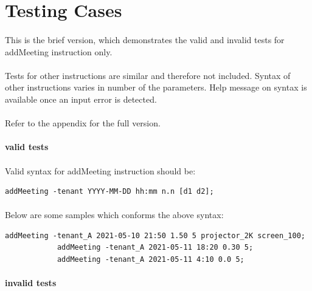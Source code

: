 \documentclass{article}
\begin{document}
    \cleardoublepage
    \section{Testing Cases}
        \paragraph{}
        This is the brief version, which demonstrates the valid and invalid tests for addMeeting instruction only.
        \paragraph{}
        Tests for other instructions are similar and therefore not included. Syntax of other instructions varies in number of the parameters. Help message on syntax is available once an input error is detected.
        \paragraph{}
        Refer to the appendix for the full version. 

        \paragraph{valid tests}
        \paragraph{}
        Valid syntax for addMeeting instruction should be:
        \begin{Verbatim}[gobble=8]
            addMeeting -tenant YYYY-MM-DD hh:mm n.n [d1 d2]; 
        \end{Verbatim}
        \paragraph{}
        Below are some samples which conforms the above syntax:
        \begin{Verbatim}[gobble=8]
            addMeeting -tenant_A 2021-05-10 21:50 1.50 5 projector_2K screen_100;
            addMeeting -tenant_A 2021-05-11 18:20 0.30 5;
            addMeeting -tenant_A 2021-05-11 4:10 0.0 5;
        \end{Verbatim}
        
        
        \paragraph{invalid tests}
\end{document}
